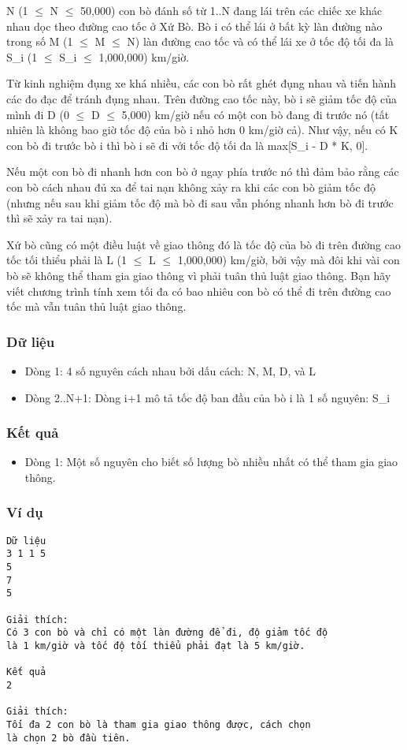 



   N (1  $\le$  N  $\le$  50,000) con bò đánh số từ 1..N đang lái trên các  chiếc xe khác nhau dọc theo đường cao tốc ở Xứ Bò. Bò i có thể  lái ở bất kỳ làn đường nào trong số M (1  $\le$  M  $\le$  N) làn đường cao  tốc và có thể lái xe ở tốc độ tối đa là S\_i (1  $\le$  S\_i  $\le$  1,000,000) km/giờ.  

   Từ kinh nghiệm đụng xe khá nhiều, các con bò rất ghét đụng nhau  và tiến hành các đo đạc để tránh đụng nhau. Trên đường cao tốc này, bò  i sẽ giảm tốc độ của mình đi D (0 $\le$  D  $\le$  5,000) km/giờ nếu có  một con bò đang đi trước nó (tất nhiên là không bao giờ tốc độ của  bò i nhỏ hơn 0 km/giờ cả). Như vậy, nếu có K con bò đi trước bò i  thì bò i sẽ đi với tốc độ tối đa là max[S\_i - D * K, 0].  

   Nếu một  con bò đi nhanh hơn con bò ở ngay phía trước nó thì đảm bảo  rằng các con bò cách nhau đủ xa để tai nạn không xảy ra khi các con  bò giảm tốc độ (nhưng nếu sau khi giảm tốc độ mà bò đi sau vẫn  phóng nhanh hơn bò đi trước thì sẽ xảy ra tai nạn).  

   Xứ bò cũng có một điều luật về giao thông đó là tốc độ của bò  đi trên đường cao tốc tối thiểu phải là L (1  $\le$  L  $\le$  1,000,000) km/giờ, bởi  vậy mà đôi khi vài con bò sẽ không thể tham gia giao thông vì  phải tuân thủ luật giao thông. Bạn hãy viết chương trình  tính xem tối đa có bao nhiêu con bò có thể đi trên đường cao tốc mà vẫn  tuân thủ luật giao thông.  

\subsubsection{   Dữ liệu  }
\begin{itemize}
	\item     Dòng 1: 4 số nguyên cách nhau bởi dấu cách: N, M, D, và L   
	\item     Dòng 2..N+1: Dòng i+1 mô tả tốc độ ban đầu của bò i là 1 số nguyên: S\_i   
\end{itemize}

\subsubsection{   Kết quả  }
\begin{itemize}
	\item     Dòng 1: Một số nguyên cho biết số lượng bò nhiều nhất có thể            tham gia giao thông.   
\end{itemize}

\subsubsection{   Ví dụ  }
\begin{verbatim}
Dữ liệu
3 1 1 5
5
7
5

Giải thích:
Có 3 con bò và chỉ có một làn đường để đi, độ giảm tốc độ 
là 1 km/giờ và tốc độ tối thiểu phải đạt là 5 km/giờ.

Kết quả
2

Giải thích:
Tối đa 2 con bò là tham gia giao thông được, cách chọn 
là chọn 2 bò đầu tiên.
\end{verbatim}
